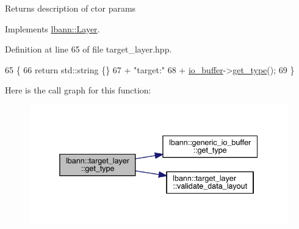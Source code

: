 Returns description of ctor params 

Implements \hyperlink{classlbann_1_1Layer_a0fa0ea9160b490c151c0a17fde4f7239}{lbann\+::\+Layer}.



Definition at line 65 of file target\+\_\+layer.\+hpp.


\begin{DoxyCode}
65                                       \{
66     \textcolor{keywordflow}{return} std::string \{\}
67       + \textcolor{stringliteral}{"target:"}
68       + \hyperlink{classlbann_1_1generic__target__layer_a8da650b94f50cc63fc90cd792fa50c3f}{io\_buffer}->\hyperlink{classlbann_1_1generic__io__buffer_adc77c0a280f8a200a8d8495c3a371ebb}{get\_type}();
69   \}
\end{DoxyCode}
Here is the call graph for this function\+:\nopagebreak
\begin{figure}[H]
\begin{center}
\leavevmode
\includegraphics[width=338pt]{classlbann_1_1target__layer_a6b5dad32cf3b771d6db1f99914ab63c4_cgraph}
\end{center}
\end{figure}
\mbox{\label{classlbann_1_1target__layer_a566c3d94992d4cbc4f17b4084664cc34}} 
